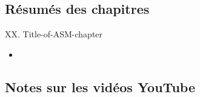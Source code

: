 \subsection{Résumés des chapitres}

\begin{CHPT_SUMM_AUTO}[label = {L.-XX}]{XX. Title-of-ASM-chapter}
	\begin{itemize}
		\item	
	\end{itemize}
\end{CHPT_SUMM_AUTO}

\subsection{Notes sur les vidéos YouTube}

